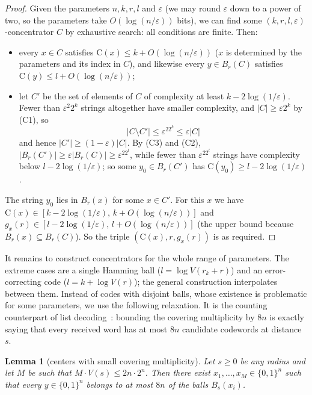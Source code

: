 \documentclass[11pt,a4paper]{article}
\newtheorem{lemma}[theorem]{Lemma}
\theoremstyle{definition}
\newcommand{\C}{\mathrm{C}}
\newcommand{\eps}{\varepsilon}
\renewcommand{\le}{\leqslant}
\renewcommand{\ge}{\geqslant}
\begin{document}
\begin{proof}
Given the parameters $n,k,r,l$ and $\eps$ (we may round $\eps$ down to a power
of two, so the parameters take $O(\log(n/\eps))$ bits), we can find some
$(k,r,l,\eps)$-concentrator $C$ by exhaustive search: all conditions are finite.
Then:
\begin{itemize}
\item every $x\in C$ satisfies $\C(x)\le k+O(\log(n/\eps))$ ($x$ is determined
  by the parameters and its index in $C$), and likewise every $y\in B_r(C)$
  satisfies $\C(y)\le l+O(\log(n/\eps))$;
\item let $C'$ be the set of elements of $C$ of complexity at least
  $k-2\log(1/\eps)$. Fewer than $\eps^2 2^k$ strings altogether have smaller
  complexity, and $|C|\ge\eps2^k$ by (C1), so
  $$|C\setminus C'|\le\eps^22^k\le\eps|C|$$ and hence
  $|C'|\ge(1-\eps)|C|$. By (C3) and (C2),
  $|B_r(C')|\ge\eps|B_r(C)|\ge\eps^22^{l}$, while fewer than $\eps^22^l$
  strings have complexity below $l-2\log(1/\eps)$; so some $y_0\in B_r(C')$
  has $\C(y_0)\ge l-2\log(1/\eps)$.
\end{itemize}
The string $y_0$ lies in $B_r(x)$ for some $x\in C'$. For this $x$ we have
$\C(x)\in[k-2\log(1/\eps),\,k+O(\log(n/\eps))]$ and
$g_x(r)\in[l-2\log(1/\eps),\,l+O(\log(n/\eps))]$ (the upper bound because
$B_r(x)\subseteq B_r(C)$). So the triple $(\C(x),r,g_x(r))$ is as required.
\end{proof}

It remains to construct concentrators for the whole range of parameters. The
extreme cases are a single Hamming ball ($l=\log V(r_k+r)$) and an
error-correcting code ($l=k+\log V(r)$); the general construction interpolates
between them. Instead of codes with disjoint balls, whose existence is
problematic for some parameters, we use the following relaxation. It is the
counting counterpart of list decoding~\cite{Elias57,Guruswami04}: bounding the
covering multiplicity by $8n$ is exactly saying that every received word has at
most $8n$ candidate codewords at distance $s$. 

\begin{lemma}[centers with small covering multiplicity]\label{lem:pack}
Let $s\ge0$ be any radius and let $M$ be such that
$M\cdot V(s)\le 2n\cdot2^n$. Then there exist $x_1,\dots,x_M\in\{0,1\}^n$ such that every $y\in\{0,1\}^n$ belongs to at
most $8n$ of the balls $B_s(x_i)$.
\end{lemma}
\end{document}
